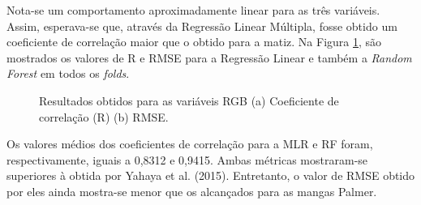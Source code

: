 Nota-se um comportamento aproximadamente linear para as três variáveis. Assim, esperava-se que, através da Regressão Linear Múltipla, fosse obtido um coeficiente de correlação maior que o obtido para a matiz.  Na Figura \ref{fig:fold_sst_rgb}, são mostrados os valores de R e RMSE para a Regressão Linear e também a \textit{Random Forest} em todos os \textit{folds}.

\begin{figure}[H]
\centering
	\caption{Resultados obtidos para as variáveis RGB (a) Coeficiente de correlação (R) (b) RMSE.}
	\label{fig:fold_sst_rgb}
\end{figure}

Os valores médios dos coeficientes de correlação para a MLR e RF foram, respectivamente, iguais a 0,8312 e 0,9415. Ambas métricas mostraram-se superiores à obtida por Yahaya et al. (2015). Entretanto, o valor de RMSE obtido por eles ainda mostra-se menor que os alcançados para as mangas Palmer.

